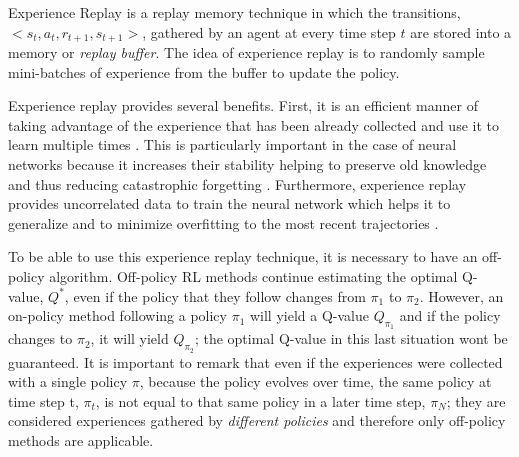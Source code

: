 Experience Replay is a replay memory technique in which the transitions, $<s_t, a_t, r_{t+1}, s_{t+1}>$, gathered by an agent at every time step $t$ are stored into a memory or \textit{replay buffer}. The idea of experience replay is to randomly sample mini-batches of experience from the buffer to update the policy. 




Experience replay provides several benefits. First, it is an efficient manner of taking advantage of the experience that has been already collected and use it to learn multiple times \cite{Experience-Replay-zhang:2018}. This is particularly important in the case of neural networks because it increases their stability helping to preserve old knowledge and thus reducing catastrophic forgetting \cite{Experience_replay_stability:2019}.
Furthermore, experience replay provides uncorrelated data to train the neural network which helps it to generalize and to minimize overfitting to the most recent trajectories \cite{Machine_learning_finance:2019}.

 

To be able to use this experience replay technique, it is necessary to have an off-policy algorithm. Off-policy RL methods continue estimating the optimal Q-value, $Q^*$, even if the policy that they follow changes from $\pi_1$ to $\pi_2$. However, an on-policy method following a policy $\pi_1$ will yield a Q-value $Q_{\pi_1}$ and if the policy changes to $\pi_2$, it will yield $Q_{\pi_2}$; the optimal Q-value in this last situation wont be guaranteed. It is important to remark that even if the experiences were collected with a single policy $\pi$, because the policy evolves over time, the same policy at time step t, $\pi_t$, is not equal to that same policy in a later time step, $\pi_N$; they are considered experiences gathered by \textit{different policies} and therefore only off-policy methods are applicable.













